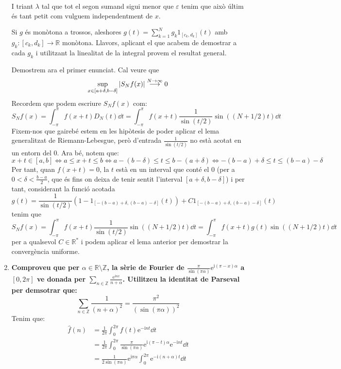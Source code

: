 \documentclass[10pt,a4paper]{article}
\newcommand{\ZZ}{\ensuremath{\mathbb{Z}}} %
\newcommand{\RR}{\ensuremath{\mathbb{R}}} %
\newcommand{\vf}[1]{\boldsymbol{\mathrm{#1}}} %
\newcommand{\ii}{\mathrm{i}} %
\theoremstyle{definition}
\renewcommand{\exp}[1]{\mathrm{e}^{#1}} %
\begin{document}
\begin{enumerate}
        I triant $\lambda$ tal que tot el segon sumand sigui menor que $\varepsilon$ tenim que això últim és tant petit com vulguem independentment de $x$.

        Si $g$ és monòtona a trossos, aleshores $g(t)=\sum_{k=1}^Ng_k\vf{1}_{[c_k,d_k]}(t)$ amb $g_k:[c_k,d_k]\rightarrow\RR$ monòtona. Llavors, aplicant el que acabem de demostrar a cada $g_k$ i utilitzant la linealitat de la integral provem el resultat general.

        Demostrem ara el primer enunciat. Cal veure que $$\sup_{x\in[a+\delta,b-\delta]}\abs{S_Nf(x)}\overset{N\to\infty}{\longrightarrow}0$$
        Recordem que podem escriure $S_Nf(x)$ com:
        $$S_Nf(x)=\int_{-\pi}^\pi f(x+t)D_N(t)\dd{t}=\int_{-\pi}^\pi f(x+t)\frac{1}{\sin(t/2)}\sin((N+1/2)t)\dd{t}$$
        Fixem-nos que gairebé estem en les hipòtesis de poder aplicar el lema generalitzat de Riemann-Lebesgue, però d'entrada $\frac{1}{\sin(t/2)}$ no està acotat en un entorn del 0. Ara bé, notem que:
        $$x+t\in [a,b]\iff a\leq x+t\leq b\iff a-(b-\delta)\leq t\leq b-(a+\delta)\iff -(b-a)+\delta\leq t\leq(b-a)-\delta$$
        Per tant, quan $f(x+t)=0$, la $t$ està en un interval que conté el 0 (per a $0<\delta<\frac{b-a}{2}$, que és fins on deixa de tenir sentit l'interval $[a+\delta,b-\delta]$) i per tant, considerant la funció acotada $$g(t)=\frac{1}{\sin(t/2)}(1-\vf{1}_{[-(b-a)+\delta,(b-a)-\delta]}(t))+C\vf{1}_{[-(b-a)+\delta,(b-a)-\delta]}(t)$$
        tenim que
        $$S_Nf(x)=\int_{-\pi}^\pi f(x+t)\frac{1}{\sin(t/2)}\sin((N+1/2)t)\dd{t}=\int_{-\pi}^\pi f(x+t)g(t)\sin((N+1/2)t)\dd{t}$$
        per a qualsevol $C\in\RR^*$ i podem aplicar el lema anterior per demostrar la convergència uniforme.
  \item \textbf{Comproveu que per $\alpha\in\RR\setminus\ZZ$, la sèrie de Fourier de $\displaystyle\frac{\pi}{\sin(\pi\alpha)}\exp{\ii(\pi-x)\alpha}$ a $[0,2\pi]$ ve donada per $\sum_{n\in\ZZ}\frac{\exp{\ii nx}}{n+\alpha}$. Utilitzeu la identitat de Parseval per demsotrar que:}
        $$\sum_{n\in\ZZ}\frac{1}{{(n+\alpha)}^2}=\frac{\pi^2}{{(\sin(\pi\alpha))}^2}$$
        Tenim que:
        \begin{align*}
          \widehat{f}(n) & =\frac{1}{2\pi}\int_{0}^{2\pi}f(t)\exp{-\ii n t}\dd{t}                                               \\
                         & =\frac{1}{2\pi}\int_{0}^{2\pi}\frac{\pi}{\sin(\pi\alpha)}\exp{\ii (\pi-t)\alpha}\exp{-\ii n t}\dd{t} \\
                         & =\frac{1}{2\sin(\pi\alpha)}\exp{\ii\pi\alpha}\int_{0}^{2\pi}\exp{-\ii (n+\alpha) t}\dd{t}            \\

\end{align*}
\end{enumerate}
\end{document}
